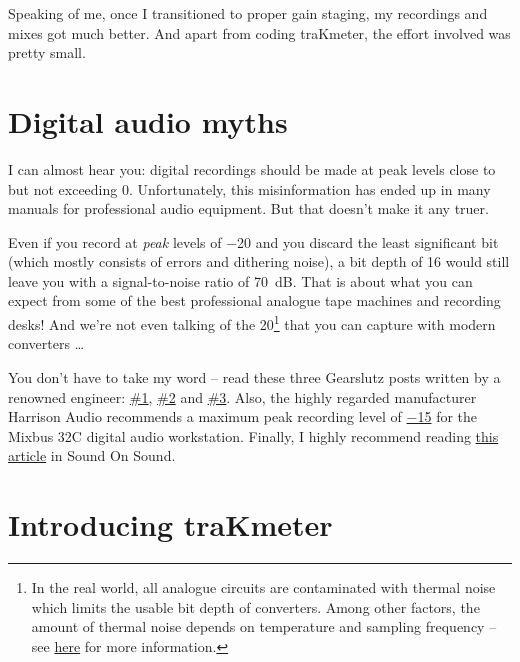 Speaking of me, once I transitioned to proper gain staging, my
recordings and mixes got much better.  And apart from coding
traKmeter, the effort involved was pretty small.

\section{Digital audio myths}
\label{sec:digital_audio_myths}

I can almost hear you: digital recordings should be made at peak
levels close to but not exceeding \SI{0}{\dBFS}.  Unfortunately, this
misinformation has ended up in many manuals for professional audio
equipment.  But that doesn't make it any truer.

Even if you record at \emph{peak} levels of \SI{-20}{\dBFS} and you
discard the least significant bit (which mostly consists of errors and
dithering noise), a bit depth of \SI{16}{\bits} would still leave you
with a signal-to-noise ratio of \SI{70}{\dB}.  That is about what you
can expect from some of the best professional analogue tape machines
and recording desks!  And we're not even talking of the
\SI{20}{\bits}\footnote{In the real world, all analogue circuits are
  contaminated with thermal noise which limits the usable bit depth of
  converters.  Among other factors, the amount of thermal noise
  depends on temperature and sampling frequency -- see
  \href{http://www.sengpielaudio.com/calculator-noise.htm}{here} for
  more information.}  that you can capture with modern converters
\dots

You don't have to take my word -- read these three Gearslutz posts
written by a renowned engineer:
\href{https://www.gearslutz.com/board/showpost.php?p=10739624&postcount=9}{\#1},
\href{https://www.gearslutz.com/board/showpost.php?p=5063154&postcount=219}{\#2}
and
\href{https://www.gearslutz.com/board/showpost.php?p=9909382&postcount=96}{\#3}.
Also, the highly regarded manufacturer Harrison Audio recommends a
maximum peak recording level of
\href{http://www.harrisonconsoles.com/mixbus/mixbus32c-4-live-manual/1/en/topic/gain-staging}{\SI{-15}{\dBFS}}
for the Mixbus 32C digital audio workstation.  Finally, I highly
recommend reading
\href{https://www.soundonsound.com/techniques/gain-staging-your-daw-software}{this
  article} in Sound On Sound.

\section{Introducing traKmeter}
\label{sec:introducing_trakmeter}

